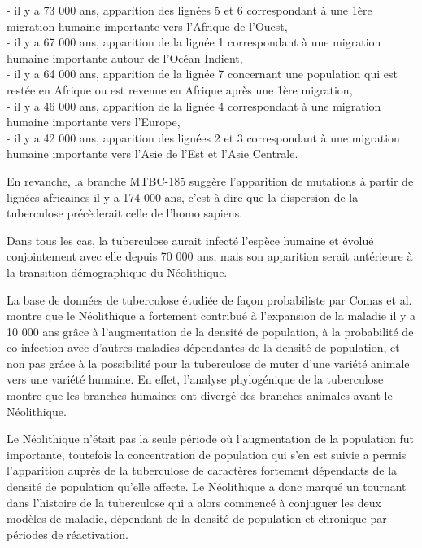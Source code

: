 \documentclass[twoside,a4paper,11pt,frenchb,openany]{report}
\begin{document}
- il y a 73 000 ans, apparition des lignées 5 et 6 correspondant à une 1ère migration humaine importante vers l'Afrique de l'Ouest,\\
- il y a 67 000 ans, apparition de la lignée 1 correspondant à une migration humaine importante autour de l'Océan Indient,\\
- il y a 64 000 ans, apparition de la lignée 7 concernant une population qui est restée en Afrique ou est revenue en Afrique après une 1ère migration,\\
- il y a 46 000 ans, apparition de la lignée 4 correspondant à une migration humaine importante vers l'Europe,\\
- il y a 42 000 ans, apparition des lignées 2 et 3 correspondant à une migration humaine importante vers l'Asie de l'Est et l'Asie Centrale. 

En revanche, la branche MTBC-185 suggère l'apparition de mutations à partir de lignées africaines il y a 174 000 ans, c'est à dire que la dispersion de la tuberculose précèderait celle de l'homo sapiens.


Dans tous les cas, la tuberculose aurait infecté l'espèce humaine et évolué conjointement avec elle depuis 70 000 ans, mais son apparition serait antérieure à la transition démographique du Néolithique.

La base de données de tuberculose étudiée de façon probabiliste par Comas et al. montre que le Néolithique a fortement contribué à l'expansion de la maladie il y a 10 000 ans grâce à l'augmentation de la densité de population, à la probabilité de co-infection avec d'autres maladies dépendantes de la densité de population, et non pas grâce à la possibilité pour la tuberculose de muter d'une variété animale vers une variété humaine. En effet, l'analyse phylogénique de la tuberculose montre que les branches humaines ont divergé des branches animales avant le Néolithique.

Le Néolithique n'était pas la seule période où l'augmentation de la population fut importante, toutefois la concentration de population qui s'en est suivie a permis l'apparition auprès de la tuberculose de caractères fortement dépendants de la densité de population qu'elle affecte. Le Néolithique a donc marqué un tournant dans l'histoire de la tuberculose qui a alors commencé à conjuguer les deux modèles de maladie, dépendant de la densité de population et chronique par périodes de réactivation.
\end{document}

